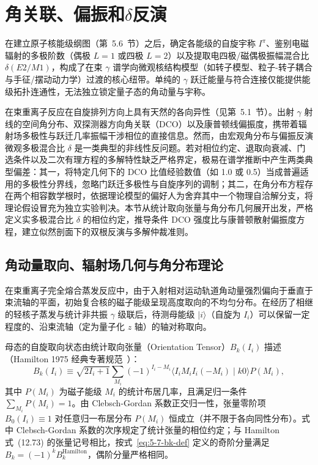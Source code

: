 \section{角关联、偏振和$\delta$反演}\label{sec:5-7}

在建立原子核能级纲图（第~5.6~节）之后，确定各能级的自旋宇称 $I^\pi$、鉴别电磁辐射的多极阶数（偶极 $L=1$ 或四极 $L=2$）以及提取电四极/磁偶极振幅混合比 $\delta(E2/M1)$，构成了在束 $\gamma$ 谱学向微观核结构模型（如转子模型、粒子-转子耦合与手征/摆动动力学）过渡的核心纽带。单纯的 $\gamma$ 跃迁能量与符合连接仅能提供能级拓扑连通性，无法独立锁定量子态的角动量与宇称。

在束重离子反应在自旋排列方向上具有天然的各向异性（见第~5.1~节）。出射 $\gamma$ 射线的空间角分布、双探测器方向角关联（DCO）以及康普顿线偏振度，携带着辐射场多极性与跃迁几率振幅干涉相位的直接信息。然而，由宏观角分布与偏振反演微观多极混合比 $\delta$ 是一类典型的非线性反问题。若对相位约定、退取向衰减、门选条件以及二次有理方程的多解特性缺乏严格界定，极易在谱学推断中产生两类典型偏差：其一，将特定几何下的 DCO 比值经验数值（如 1.0 或 0.5）当成普遍适用的多极性分界线，忽略门跃迁多极性与自旋序列的调制；其二，在角分布方程存在两个相容数学根时，依据理论模型的偏好人为舍弃其中一个物理自洽解分支，将理论假设冒充为独立实验判决。本节从统计取向张量与角分布几何展开出发，严格定义实多极混合比 $\delta$ 的相位约定，推导条件 DCO 强度比与康普顿散射偏振度方程，建立似然剖面下的双根反演与多解仲裁准则。

\subsection{角动量取向、辐射场几何与角分布理论}\label{subsec:5-7-1}

在束重离子完全熔合蒸发反应中，由于入射相对运动轨道角动量强烈偏向于垂直于束流轴的平面，初始复合核的磁子能级呈现高度取向的不均匀分布。在经历了相继的轻核子蒸发与统计非共振 $\gamma$ 级联后，待测母能级 $|i\rangle$（自旋为 $I_i$）可以保留一定程度的、沿束流轴（定为量子化 $z$ 轴）的轴对称取向。

母态的自旋取向状态由统计取向张量（Orientation Tensor）$B_k(I_i)$ 描述（Hamilton 1975 经典专著规范~\cite{book-hamilton-electromagnetic-interaction}）：
\begin{equation}\label{eq:5-7-bk-def}
B_k(I_i) \equiv \sqrt{2I_i + 1} \sum_{M_i} (-1)^{I_i - M_i} \langle I_i M_i I_i (-M_i) \mid k 0 \rangle P(M_i),
\end{equation}
其中 $P(M_i)$ 为磁子能级 $M_i$ 的统计布居几率，且满足归一条件 $\sum_{M_i} P(M_i) = 1$。由 Clebsch-Gordan 系数正交归一性，张量零阶项 $B_0(I_i) \equiv 1$ 对任意归一布居分布 $P(M_i)$ 恒成立（并不限于各向同性分布）。式中 Clebsch-Gordan 系数的次序规定了统计张量的相位约定；与 Hamilton 式~(12.73) 的张量记号相比，按式~\eqref{eq:5-7-bk-def} 定义的奇阶分量满足 $B_k = (-1)^k B_k^{\mathrm{Hamilton}}$，偶阶分量严格相同。

